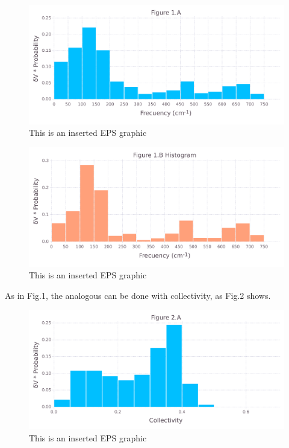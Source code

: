 \documentclass[10pt,letterpaper]{article}
\begin{document}
\begin{figure}[ht]
\begin{center}
\includegraphics[scale=0.5]{1hvr_apo/1afigure_hi-precision.pdf}
\caption{This is an inserted EPS graphic}
\label{fig1}
\end{center}
\end{figure}

\begin{figure}[ht]
\begin{center}
\includegraphics[scale=0.5]{1hvr_apo/1bfigure_hi-precision.pdf}
\caption{This is an inserted EPS graphic}
\label{fig2}
\end{center}
\end{figure}

\clearpage
As in Fig.1, the analogous can be done with collectivity, as Fig.2 shows. 

\begin{figure}[ht]
\begin{center}
\includegraphics[scale=0.5]{1hvr_apo/2afigure_hi-precision.pdf}
\caption{This is an inserted EPS graphic}
\label{fig3}
\end{center}
\end{figure}
\end{document}
